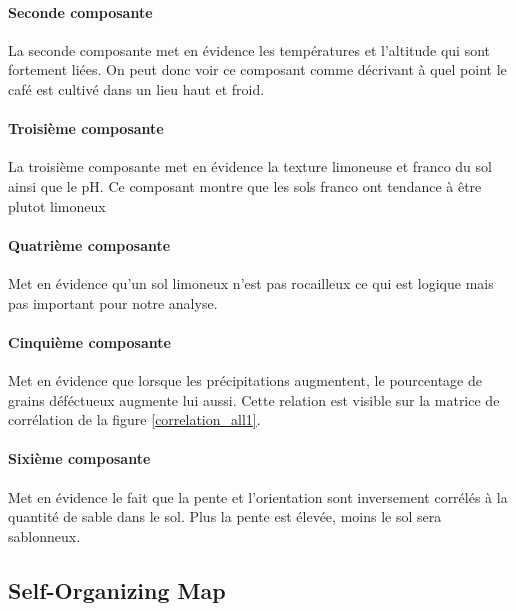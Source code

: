 \paragraph{Seconde composante} La seconde composante met en évidence les températures et l'altitude qui sont fortement liées. On peut donc voir ce composant comme décrivant à quel point le café est cultivé dans un lieu haut et froid. 

\paragraph{Troisième composante} La troisième composante met en évidence la texture limoneuse et franco du sol ainsi que le pH. Ce composant montre que les sols franco ont tendance à être plutot limoneux 

\paragraph{Quatrième composante} Met en évidence qu'un sol limoneux n'est pas rocailleux ce qui est logique mais pas important pour notre analyse.

\paragraph{Cinquième composante} Met en évidence que lorsque les précipitations augmentent, le pourcentage de grains déféctueux augmente lui aussi. Cette relation est visible sur la matrice de corrélation de la figure \ref{correlation_all1}. 

\paragraph{Sixième composante} Met en évidence le fait que la pente et l'orientation sont inversement corrélés à la quantité de sable dans le sol. Plus la pente est élevée, moins le sol sera sablonneux. 







\newpage
\subsection{Self-Organizing Map}


